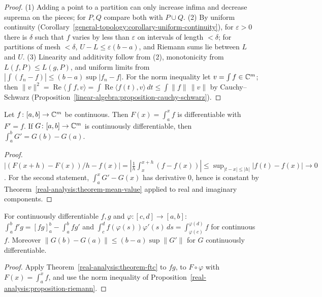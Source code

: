 \begin{proof}
(1) Adding a point to a partition can only increase infima and decrease suprema on the pieces; for $P, Q$ compare both with $P \cup Q$. (2) By uniform continuity
(Corollary~\ref{general-topology:corollary-uniform-continuity}), for $\varepsilon > 0$ there is $\delta$ such that $f$ varies by less than $\varepsilon$ on intervals of length $< \delta$; for partitions of mesh
$< \delta$, $U - L \leq \varepsilon(b - a)$, and Riemann sums lie between $L$ and $U$. (3) Linearity and additivity follow from (2), monotonicity from $L(f, P) \leq L(g, P)$, and uniform limits from
$|\int(f_n - f)| \leq (b - a)\sup|f_n - f|$. For the norm inequality let $v = \int f \in \mathbb{C}^m$; then
$\|v\|^2 = \operatorname{Re}\langle \int f, v \rangle = \int\operatorname{Re}\langle f(t), v \rangle\,dt \leq \int\|f\|\,\|v\|$ by Cauchy--Schwarz (Proposition~\ref{linear-algebra:proposition-cauchy-schwarz}).
\end{proof}

\begin{theorem}\label{real-analysis:theorem-ftc}
Let $f \colon [a, b] \to \mathbb{C}^m$ be continuous. Then $F(x) = \int_a^xf$ is differentiable with $F' = f$. If $G \colon [a, b] \to \mathbb{C}^m$ is continuously differentiable, then $\int_a^bG' = G(b) - G(a)$.
\end{theorem}

\begin{proof}
$|(F(x + h) - F(x))/h - f(x)| = |\frac1h\int_x^{x+h}(f - f(x))| \leq \sup_{|t - x| \leq |h|}|f(t) - f(x)| \to 0$. For the second statement, $\int_a^xG' - G(x)$ has derivative $0$, hence is constant by
Theorem~\ref{real-analysis:theorem-mean-value} applied to real and imaginary components.
\end{proof}

\begin{corollary}\label{real-analysis:corollary-integration-rules}
For continuously differentiable $f, g$ and $\varphi \colon [c, d] \to [a, b]$: $\int_a^bf'g = [fg]_a^b - \int_a^bfg'$ and $\int_c^df(\varphi(s))\varphi'(s)\,ds = \int_{\varphi(c)}^{\varphi(d)}f$ for continuous $f$.
Moreover $\|G(b) - G(a)\| \leq (b - a)\sup\|G'\|$ for $G$ continuously differentiable.
\end{corollary}

\begin{proof}
Apply Theorem~\ref{real-analysis:theorem-ftc} to $fg$, to $F \circ \varphi$ with $F(x) = \int_a^xf$, and use the norm inequality of Proposition~\ref{real-analysis:proposition-riemann}.
\end{proof}

